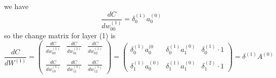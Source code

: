 \documentclass{article}
\begin{document}
we have
$$\frac{dC}{dw_{00}^{(1)}} = \delta_0^{(1)}a_0^{(0)}$$
so the change matrix for layer (1) is
$$\frac{dC}{dW^{(1)}} = 
\begin{pmatrix}
\frac{dC}{dw_{00}^{(1)}} & \frac{dC}{dw_{01}^{(1)}} & \frac{dC}{dw_{02}^{(1)}}
\\\\
\frac{dC}{dw_{10}^{(1)}} & \frac{dC}{dw_{11}^{(1)}} & \frac{dC}{dw_{12}^{(1)}} 
\end{pmatrix} = \begin{pmatrix}
\delta_0^{(1)}a_0^{(0} & \delta_0^{(1)}a_1^{(0)} & \delta_0^{(1)} \cdot 1
\\\\
\delta_1^{(1)}a_0^{(0)} & \delta_1^{(1)}a_1^{(0)} & \delta_1^{(2)} \cdot 1
\end{pmatrix} = \delta^{(1)}A^{(0)}$$
\end{document}
